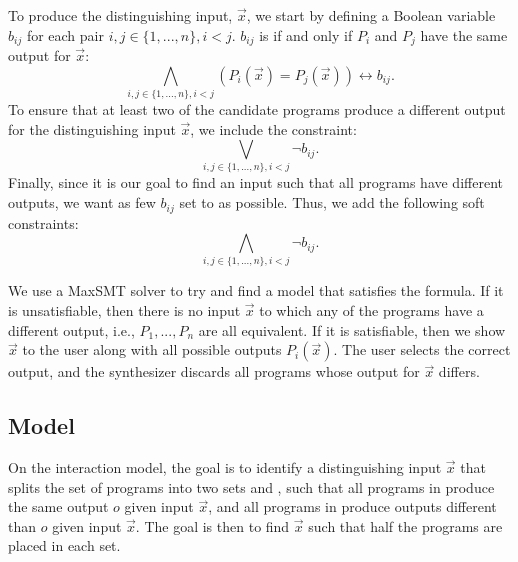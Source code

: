 To produce the distinguishing input, \(\vec{x}\), we start by defining a Boolean variable \(b_{ij}\) for each pair \(i,j\in\{1, ..., n\},i<j\). \(b_{ij}\) is \true if and only if \(P_i\) and \(P_j\) have the same output for \(\vec{x}\):
%
\begin{equation}
    \bigwedge_{i,j \in \{1, ..., n\}, i < j} (P_i(\vec{x}) = P_j(\vec{x})) \leftrightarrow b_{ij}.
\end{equation}
%
To ensure that at least two of the candidate programs produce a different output for the distinguishing input \(\vec{x}\), we include the constraint:
%
\begin{equation}
    \bigvee_{i,j \in \{1, ..., n\}, i < j} \neg b_{ij}.
\end{equation}
%
Finally, since it is our goal to find an input such that all programs have different outputs, we want as few \(b_{ij}\) set to \true as possible.
Thus, we add the following soft constraints:
%
\begin{equation}
    \bigwedge_{i,j \in \{1, ..., n\}, i < j} \neg b_{ij}.
\end{equation}

We use a \ac{MaxSMT} solver to try and find a model that satisfies the formula. If it is unsatisfiable, then there is no input \(\vec{x}\) to which any of the programs have a different output, i.e., \(P_1, ..., P_n\) are all equivalent. If it is satisfiable, then we show \(\vec{x}\) to the user along with all possible outputs \(P_i(\vec{x})\). The user selects the correct output, and the synthesizer discards all programs whose output for \(\vec{x}\) differs.

\subsection{\ynmodel Model}

On the \ynmodel interaction model, the goal is to identify a distinguishing input \(\vec{x}\) that splits the set of programs into two sets  and , such that all programs in  produce the same output \(o\)  given input \(\vec{x}\), and all programs in  produce outputs different than \(o\) given input \(\vec{x}\).
%
The goal is then to find \(\vec{x}\) such that half the programs are placed in each set.

